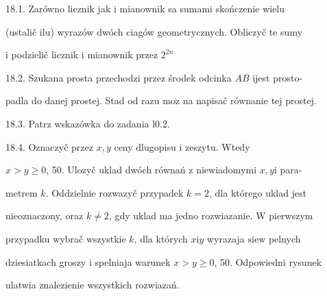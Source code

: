 \documentclass[a4paper,12pt]{article}
\begin{document}
18.1. Zarówno licznik jak $\mathrm{i}$ mianownik sa sumami skończenie wielu

(ustalič $\mathrm{i}\mathrm{l}\mathrm{u}$) wyrazów dwóch ciagów geometrycznych. Obliczyč te sumy

$\mathrm{i}$ podzielič licznik $\mathrm{i}$ mianownik przez $2^{2n}$

18.2. Szukana prosta przechodzi przez środek odcinka $AB$ ijest prosto-

padla do danej prostej. Stad od razu $\mathrm{m}\mathrm{o}\dot{\mathrm{z}}$ na napisač równanie tej prostej.

18.3. Patrz wskazówka do zadania l0.2.

18.4. Oznaczyč przez $x, y$ ceny dlugopisu $\mathrm{i}$ zeszytu. Wtedy

$x >y\geq 0$, 50. Ulozyč uklad dwóch równań $\mathrm{z}$ niewiadomymi $x, y\mathrm{i}$ para-

metrem $k$. Oddzielnie rozwazyč przypadek $k = 2$, dla którego uklad jest

nieoznaczony, oraz $k\neq 2$, gdy uklad ma jedno rozwiazanie. $\mathrm{W}$ pierwszym

przypadku wybrač wszystkie $k$, dla których $x\mathrm{i}y$ wyrazaja $\mathrm{s}\mathrm{i}\mathrm{e}\mathrm{w}$ pelnych

dziesiatkach groszy $\mathrm{i}$ spelniaja warunek $x>y\geq 0$, 50. Odpowiedni rysunek

ulatwia znalezienie wszystkich rozwiazań.
\end{document}
